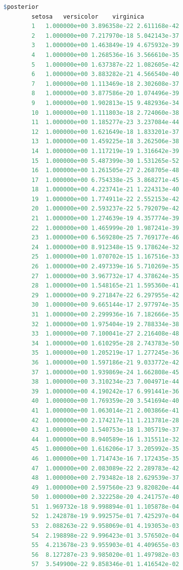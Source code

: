 \documentclass[12pt, a4paper, oneside]{ctexart}
\begin{document}
\begin{appendices}
\begin{lstlisting}[language=R, caption={训练好的模型对鸢尾花数据集的预测结果}, label=predictIris]
		$posterior
		setosa   versicolor    virginica
		1   1.000000e+00 3.896358e-22 2.611168e-42
		2   1.000000e+00 7.217970e-18 5.042143e-37
		3   1.000000e+00 1.463849e-19 4.675932e-39
		4   1.000000e+00 1.268536e-16 3.566610e-35
		5   1.000000e+00 1.637387e-22 1.082605e-42
		6   1.000000e+00 3.883282e-21 4.566540e-40
		7   1.000000e+00 1.113469e-18 2.302608e-37
		8   1.000000e+00 3.877586e-20 1.074496e-39
		9   1.000000e+00 1.902813e-15 9.482936e-34
		10  1.000000e+00 1.111803e-18 2.724060e-38
		11  1.000000e+00 1.185277e-23 3.237084e-44
		12  1.000000e+00 1.621649e-18 1.833201e-37
		13  1.000000e+00 1.459225e-18 3.262506e-38
		14  1.000000e+00 1.117219e-19 1.316642e-39
		15  1.000000e+00 5.487399e-30 1.531265e-52
		16  1.000000e+00 1.261505e-27 2.268705e-48
		17  1.000000e+00 6.754338e-25 3.868271e-45
		18  1.000000e+00 4.223741e-21 1.224313e-40
		19  1.000000e+00 1.774911e-22 2.552153e-42
		20  1.000000e+00 2.593237e-22 5.792079e-42
		21  1.000000e+00 1.274639e-19 4.357774e-39
		22  1.000000e+00 1.465999e-20 1.987241e-39
		23  1.000000e+00 6.569280e-25 7.769177e-46
		24  1.000000e+00 8.912348e-15 9.178624e-32
		25  1.000000e+00 1.070702e-15 1.167516e-33
		26  1.000000e+00 2.497339e-16 5.710269e-35
		27  1.000000e+00 3.967732e-17 4.378624e-35
		28  1.000000e+00 1.548165e-21 1.595360e-41
		29  1.000000e+00 9.271847e-22 6.297955e-42
		30  1.000000e+00 9.665144e-17 2.977974e-35
		31  1.000000e+00 2.299936e-16 7.182666e-35
		32  1.000000e+00 1.975404e-19 2.788334e-38
		33  1.000000e+00 7.100041e-27 2.216408e-48
		34  1.000000e+00 1.610295e-28 2.743783e-50
		35  1.000000e+00 1.205219e-17 1.277245e-36
		36  1.000000e+00 1.597186e-21 9.033772e-42
		37  1.000000e+00 1.939869e-24 1.662808e-45
		38  1.000000e+00 3.310234e-23 7.004971e-44
		39  1.000000e+00 4.190242e-17 6.991441e-36
		40  1.000000e+00 1.769359e-20 3.541694e-40
		41  1.000000e+00 1.063014e-21 2.003866e-41
		42  1.000000e+00 2.174217e-11 1.213781e-28
		43  1.000000e+00 1.540753e-18 1.305719e-37
		44  1.000000e+00 8.940589e-16 1.315511e-32
		45  1.000000e+00 1.616206e-17 3.205992e-35
		46  1.000000e+00 1.714743e-16 7.172435e-35
		47  1.000000e+00 2.083089e-22 2.289783e-42
		48  1.000000e+00 2.793482e-18 2.629539e-37
		49  1.000000e+00 2.597560e-23 9.820820e-44
		50  1.000000e+00 2.322258e-20 4.241757e-40
		51  1.969732e-18 9.998894e-01 1.105878e-04
		52  1.242878e-19 9.992575e-01 7.425297e-04
		53  2.088263e-22 9.958069e-01 4.193053e-03
		54  2.198898e-22 9.996423e-01 3.576502e-04
		55  4.213678e-23 9.955903e-01 4.409655e-03
		56  8.127287e-23 9.985020e-01 1.497982e-03
		57  3.549900e-22 9.858346e-01 1.416542e-02

\end{lstlisting}
\end{appendices}
\end{document}
